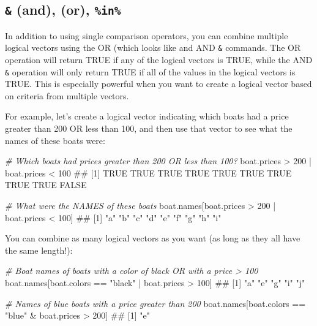 \documentclass[]{book}
\newenvironment{Shaded}{\begin{snugshade}}{\end{snugshade}}
\newcommand{\DecValTok}[1]{\textcolor[rgb]{0.00,0.00,0.81}{{#1}}}
\newcommand{\StringTok}[1]{\textcolor[rgb]{0.31,0.60,0.02}{{#1}}}
\newcommand{\CommentTok}[1]{\textcolor[rgb]{0.56,0.35,0.01}{\textit{{#1}}}}
\newcommand{\NormalTok}[1]{{#1}}
\theoremstyle{definition}
\theoremstyle{definition}
\theoremstyle{remark}
\begin{document}
\subsection{\texorpdfstring{\texttt{\&} (and), \texttt{\textbar{}} (or),
\texttt{\%in\%}}{\& (and), \textbar{} (or), \%in\%}}\label{and-or-in}

In addition to using single comparison operators, you can combine
multiple logical vectors using the OR (which looks like
\texttt{\textbar{}} and AND \texttt{\&} commands. The OR
\texttt{\textbar{}} operation will return TRUE if any of the logical
vectors is TRUE, while the AND \texttt{\&} operation will only return
TRUE if all of the values in the logical vectors is TRUE. This is
especially powerful when you want to create a logical vector based on
criteria from multiple vectors.

For example, let's create a logical vector indicating which boats had a
price greater than 200 OR less than 100, and then use that vector to see
what the names of these boats were:

\begin{Shaded}
\begin{Highlighting}[]
\CommentTok{# Which boats had prices greater than 200 OR less than 100?}
\NormalTok{boat.prices >}\StringTok{ }\DecValTok{200} \NormalTok{|}\StringTok{ }\NormalTok{boat.prices <}\StringTok{ }\DecValTok{100}
\NormalTok{##  [1]  TRUE  TRUE  TRUE  TRUE  TRUE  TRUE  TRUE  TRUE  TRUE FALSE}

\CommentTok{# What were the NAMES of these boats}
\NormalTok{boat.names[boat.prices >}\StringTok{ }\DecValTok{200} \NormalTok{|}\StringTok{ }\NormalTok{boat.prices <}\StringTok{ }\DecValTok{100}\NormalTok{]}
\NormalTok{## [1] "a" "b" "c" "d" "e" "f" "g" "h" "i"}
\end{Highlighting}
\end{Shaded}

You can combine as many logical vectors as you want (as long as they all
have the same length!):

\begin{Shaded}
\begin{Highlighting}[]
\CommentTok{# Boat names of boats with a color of black OR with a price > 100}
\NormalTok{boat.names[boat.colors ==}\StringTok{ "black"} \NormalTok{|}\StringTok{ }\NormalTok{boat.prices >}\StringTok{ }\DecValTok{100}\NormalTok{]}
\NormalTok{## [1] "a" "e" "g" "i" "j"}

\CommentTok{# Names of blue boats with a price greater than 200}
\NormalTok{boat.names[boat.colors ==}\StringTok{ "blue"} \NormalTok{&}\StringTok{ }\NormalTok{boat.prices >}\StringTok{ }\DecValTok{200}\NormalTok{]}
\NormalTok{## [1] "e"}
\end{Highlighting}
\end{Shaded}
\end{document}
